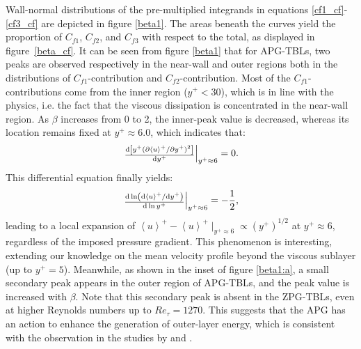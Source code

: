 Wall-normal distributions of the pre-multiplied integrands in equations \eqref{cf1_cf}-\eqref{cf3_cf} are depicted in figure \ref{beta1}. The areas beneath the curves yield the proportion of $C_{f1}$, $C_{f2}$, and $C_{f3}$ with respect to the total, as displayed in figure~\ref{beta_cf}. It can be seen from figure \ref{beta1} that  for APG-TBLs, two peaks are observed respectively in the near-wall and outer regions both in the  distributions of $C_{f1}$-contribution and $C_{f2}$-contribution. 
Most of the $C_{f1}$-contributions come from the inner region ($y^+<30$), which is in line with the physics, i.e. the fact that the viscous dissipation is concentrated in the near-wall region\cite{Pope2000}. 
{\color{black}
As $\beta$ increases from 0 to 2, the inner-peak value is decreased, whereas its location remains fixed at $y^+ \approx 6.0$, which indicates that: 
\begin{equation}\label{eq:6}
\left.\begin{matrix}
\frac{{\rm d} \left[{y^+(\partial\left<u\right>^+/\partial y^+)^2}\right]}{{\rm d} y^+} 
\end{matrix}\right|_{y^+\approx6} =0.
\end{equation}
This differential equation finally yields:
\begin{equation}\label{eq:7}
\left.\begin{matrix}
\frac{{\rm d} \ln \left({{\rm d} \left<u\right>^+}/{{\rm d} y^+}\right)}{{\rm d} \ln y^+}
\end{matrix}\right|_{y^+\approx6}=-\frac{1}{2},
\end{equation}
leading to a local expansion of $\left<u\right>^+-\left<u\right>^+\mid_{y^+\approx6} \propto \left (y^{+}\right)^{1/2}$ at $y^+\approx6$, regardless of the imposed pressure gradient.
This phenomenon is interesting, extending our knowledge on the mean velocity profile beyond the viscous sublayer (up to $y^+=5$).
}
Meanwhile, as shown in the inset of figure \ref{beta1:a}, a small secondary peak appears in the outer region of APG-TBLs, and the peak value is increased with $\beta$. 
Note that this secondary peak is absent in the ZPG-TBLs, even at higher Reynolds numbers up to $Re_\tau=1270$\cite{Fan2019}. This suggests that the APG has an action to enhance the generation of outer-layer energy, which is consistent with the observation in the studies by \citet{Tanarro2020} and \citet{Vila2020}.


